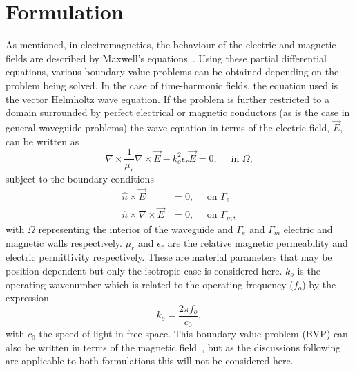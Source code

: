 \section{Formulation}
\label{lezar:sec:formulation}

As mentioned, in electromagnetics, the behaviour of the electric and
magnetic fields are described by Maxwell's equations~\cite{Jin2002,
Smi1997}.  Using these partial differential equations, various
boundary value problems can be obtained depending on the problem being
solved.  In the case of time-harmonic fields, the equation used is the
vector Helmholtz wave equation. If
the problem is further restricted to a domain surrounded by perfect
electrical or magnetic conductors (as is the case in general waveguide
problems) the wave equation in terms of the electric field, $\vec{E}$, can
be written as~\cite{Jin2002}
\begin{equation}
    \label{lezar:eqn:vector_helmholtz}
    \nabla\times\frac{1}{\mu_r}\nabla\times\vec{E} - k_o^2\epsilon_r\vec{E} = 0,\quad \text{ in
    $\Omega$},
\end{equation}
subject to the boundary conditions
\begin{align}
    \label{lezar:eqn:electric_wall_BC}
    \hat{n}\times\vec{E} &= 0,\quad \text{ on $\Gamma_{e}$}\\
    \label{lezar:eqn:magnetic_wall_BC}
    \hat{n}\times\nabla\times{\vec{E}}{} &= 0,\quad \text{ on $\Gamma_{m}$},
\end{align}
with $\Omega$ representing the interior of the waveguide and
$\Gamma_{e}$ and $\Gamma_{m}$ electric and magnetic walls
respectively. $\mu_r$ and $\epsilon_r$ are the relative magnetic permeability
and electric permittivity respectively.  These are material parameters
that may be position dependent but only the isotropic case is
considered here. $k_o$ is the operating
wavenumber which is related to the
operating frequency ($f_o$) by the expression
\begin{equation}
 k_o = \frac{2\pi f_o}{c_0},
\end{equation}
with $c_0$ the speed of light in free space.  This boundary value
problem (BVP) can also be written in terms of the magnetic
field~\cite{Jin2002}, but as the discussions following are applicable
to both formulations this will not be considered here.

